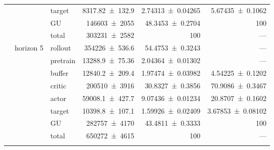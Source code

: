 {\begin{longtable}{@{}lllrrr@{}}
     &  & target & \num{8317.82+-132.9} & \num{2.74313+-0.04265} & \num{5.67435+-0.1062} \\
     &  & GU & \num{146603+-2055} & \num{48.3453+-0.2704} & 100 \\
     &  & total & \num{303231+-2582} & \num{100} & --- \\
    \addlinespace[2pt]
     & horizon 5 & rollout & \num{354226+-536.6} & \num{54.4753+-0.3243} & --- \\
     &  & pretrain & \num{13288.9+-75.36} & \num{2.04364+-0.01302} & --- \\
     &  & buffer & \num{12840.2+-209.4} & \num{1.97474+-0.03982} & \num{4.54225+-0.1202} \\
     &  & critic & \num{200510+-3916} & \num{30.8327+-0.3856} & \num{70.9086+-0.3467} \\
     &  & actor & \num{59008.1+-427.7} & \num{9.07436+-0.01234} & \num{20.8707+-0.1602} \\
     &  & target & \num{10398.8+-107.1} & \num{1.59926+-0.02409} & \num{3.67853+-0.08102} \\
     &  & GU & \num{282757+-4170} & \num{43.4811+-0.3333} & 100 \\
     &  & total & \num{650272+-4615} & \num{100} & --- \\
    \addlinespace[2pt]
  \end{longtable}
}

